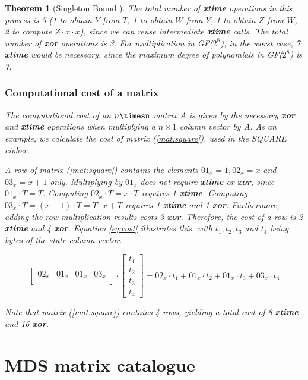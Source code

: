 \documentclass{report}
\newtheorem{theorem}{Theorem}{\bfseries}{\itshape}
\begin{document}
\begin{theorem}[Singleton Bound \cite{SloaneBook}]
The total number of \textbf{xtime} operations in this process is 5 (1 to obtain $Y$ from $T$, 1 to obtain $W$ from $Y$, 1 to obtain $Z$ from $W$, 2 to compute $Z \cdot x \cdot x$), since we can reuse intermediate \textbf{xtime} calls. The total number of \textbf{xor} operations is 3. For multiplication in GF($2^8$), in the worst case, 7 \textbf{xtime} would be necessary, since the maximum degree of polynomials in GF($2^8$) is 7.

\subsubsection{Computational cost of a matrix}
The computational cost of an $n\timesn$ matrix $A$ is given by the necessary \textbf{xor} and \textbf{xtime} operations when multiplying a $n\times1$ column vector by $A$. As an example, we calculate the cost of matrix (\ref{mat:square}), used in the SQUARE \cite{SQUARE1997} cipher. 

A row of matrix (\ref{mat:square}) contains the elements $01_x = 1, 02_x = x$ and $03_x = x + 1$ only. Multiplying by $01_x$ does not require \textbf{xtime} or \textbf{xor}, since $01_x \cdot T = T$. Computing $02_x \cdot T = x \cdot T$ requires 1 \textbf{xtime}. Computing $03_x \cdot T = (x + 1) \cdot T = T \cdot x + T$ requires 1 \textbf{xtime} and 1 \textbf{xor}. Furthermore, adding the row multiplication results costs 3 \textbf{xor}. Therefore, the cost of a row is 2 \textbf{xtime} and 4 \textbf{xor}. Equation \ref{eq:cost} illustrates this, with $t_1, t_2, t_3$ and $t_4$ being bytes of the state column vector.

\begin{equation}\label{eq:cost}
\begin{bmatrix}
02_x & 01_x & 01_x & 03_x\\
\end{bmatrix}
\cdot 
\begin{bmatrix}
t_1\\
t_2\\
t_3\\
t_4
\end{bmatrix}
= 02_x \cdot t_1 + 01_x \cdot t_2 + 01_x \cdot t_3 + 03_x \cdot t_4
\end{equation}

Note that matrix (\ref{mat:square}) contains 4 rows, yielding a total cost of 8 \textbf{xtime} and 16 \textbf{xor}.

\section{MDS matrix catalogue}


\end{theorem}
\end{document}
